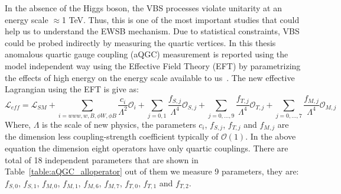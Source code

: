 In the absence of the Higgs boson, the VBS processes violate unitarity at an energy scale $\approx$1 TeV. Thus, this is one of the most important studies that could help us to understand the EWSB mechanism. Due to statistical constraints, VBS could be probed indirectly by measuring the quartic vertices. In this thesis anomalous quartic gauge coupling (aQGC) measurement is reported using the model independent way using the Effective Field Theory (EFT) by parametrizing the effects of high energy on the energy scale available to us~\cite{aqgc_operators}. The new effective Lagrangian using the EFT is give as:
\begin{equation}
	\mathcal{L}_{eff} = \mathcal{L}_{SM} + \sum_{i=www,w,B, \phi W, \phi B} \frac{c_i}{\Lambda^2} {\mathcal{O}}_i + \sum_{j=0,1}\frac{f_{S,j}}{\Lambda^4} \mathcal{O}_{S,j} + \sum_{j=0,...,9}\frac{f_{T,j}}{\Lambda^4} \mathcal{O}_{T,j}  + \sum_{j=0,...,7} \frac{f_{M,j}}{\Lambda^4} \mathcal{O}_{M,j}
\end{equation}
Where, $\Lambda$ is the scale of new physics, the parameters $c_i$, $f_{S,j}$, $f_{T,j}$ and $f_{M,j}$ are the dimension less coupling-strength coefficient typically of $\mathcal{O}(1)$. In the above equation the dimension eight operators have only quartic couplings. There are total of 18 independent parameters that are shown in Table~\ref{table:aQGC_alloperator} out of them we measure 9 parameters, they are: $f_{S,0}$, $f_{S,1}$, $f_{M,0}$, $f_{M,1}$, $f_{M,6}$, $f_{M,7}$, $f_{T,0}$, $f_{T,1}$ and $f_{T,2}$. 
